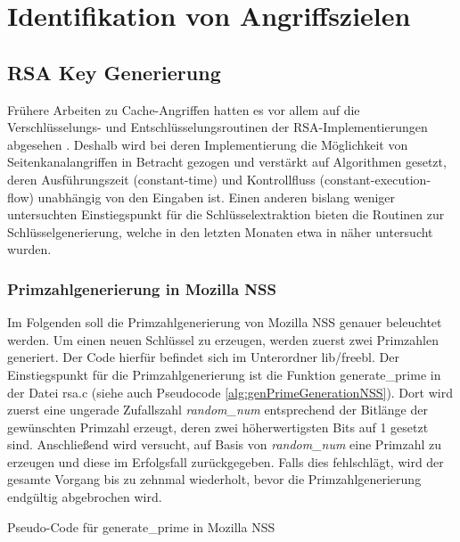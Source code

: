\chapter{Identifikation von Angriffszielen}
\label{chapter:results}

\section{RSA Key Generierung}

Frühere Arbeiten zu Cache-Angriffen hatten es vor allem auf die Verschlüsselungs- und Entschlüsselungsroutinen der RSA-Implementierungen abgesehen \cite{FlushReload, CacheBleed}.
Deshalb wird bei deren Implementierung die Möglichkeit von Seitenkanalangriffen in Betracht gezogen und verstärkt auf Algorithmen gesetzt, deren Ausführungszeit (constant-time) und Kontrollfluss (constant-execution-flow) unabhängig von den Eingaben ist.
Einen anderen bislang weniger untersuchten Einstiegspunkt für die Schlüsselextraktion bieten die Routinen zur Schlüsselgenerierung, welche in den letzten Monaten etwa in \cite{RSAKeyGeneration2} näher untersucht wurden.

\subsection{Primzahlgenerierung in Mozilla NSS}

Im Folgenden soll die Primzahlgenerierung von Mozilla NSS genauer beleuchtet werden.
Um einen neuen Schlüssel zu erzeugen, werden zuerst zwei Primzahlen generiert. 
Der Code hierfür befindet sich im Unterordner lib/freebl.
Der Einstiegspunkt für die Primzahlgenerierung ist die Funktion generate_prime in der Datei rsa.c (siehe auch Pseudocode \ref{alg:genPrimeGenerationNSS}).
Dort wird zuerst eine ungerade Zufallszahl \textit{random_num} entsprechend der Bitlänge der gewünschten Primzahl erzeugt, deren zwei höherwertigsten Bits auf 1 gesetzt sind.
Anschließend wird versucht, auf Basis von \textit{random_num} eine Primzahl zu erzeugen und diese im Erfolgsfall zurückgegeben.
Falls dies fehlschlägt, wird der gesamte Vorgang bis zu zehnmal wiederholt, bevor die Primzahlgenerierung endgültig abgebrochen wird.

\begin{algorithm}[h]
\DontPrintSemicolon
\caption{Pseudo-Code für generate_prime in Mozilla NSS}
\label{alg:genPrimeGenerationNSS}

\end{algorithm}

